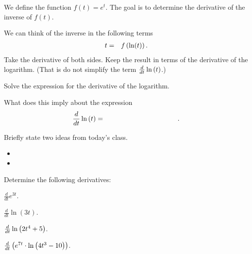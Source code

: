 \begin{problem}
\clearpage

\item We define the function $f(t)=e^t$. The goal is to determine the
  derivative of the inverse of $f(t)$.
  \begin{subproblem}
  \item We can think of the inverse in the following terms
    \begin{eqnarray*}
      t & = & f\left(\ln (t) \right).
    \end{eqnarray*}
    Take the derivative of both sides.  Keep the result in terms of the derivative of the
    logarithm.  (That is do not simplify the term
    $\frac{d}{dt} \ln\left( t \right)$.)
    \vfill
  \item Solve the expression for the derivative of the logarithm.
    \vfill
    \item What does this imply about the expression
    \begin{eqnarray*}
      \frac{d}{dt} \ln\lp t \rp & = & \hspace{10em}.
    \end{eqnarray*}
  \end{subproblem}

\end{problem}

\postClass

\begin{problem}
\item Briefly state two ideas from today's class.
  \begin{itemize}
  \item 
  \item 
  \end{itemize}
\item Determine the following derivatives:
  \begin{subproblem}
    \item $\frac{d}{dt} e^{3t}$.
      \vfill
    \item $\frac{d}{dt} \ln(3t)$.
      \vfill
    \item $\frac{d}{dt} \ln\left( 2t^4 + 5\right)$.
      \vfill
    \item $\frac{d}{dt} \left( e^{7t} \cdot \ln \left( 4t^3 - 10\right) \right)$.
      \vfill
  \end{subproblem}
\end{problem}


